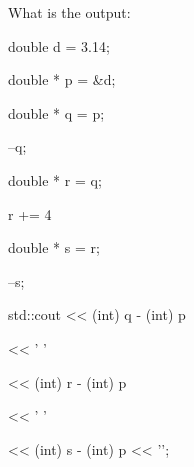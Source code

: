 What is the output:



\begin{consolethree}[escapeinside=||]

double d = 3.14;

double * p = &d;

double * q = p;

--q;

double * r = q;

r += 4

double * s = r;

--s;

std::cout << (int) q - (int) p

          << ' '

          << (int) r - (int) p

          << ' '

          << (int) s - (int) p << '\n';

\end{consolethree}

